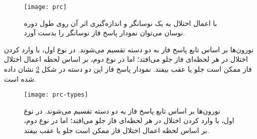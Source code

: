\begin{figure}[h!]
	\centering
	\texttt{[image: prc]}
    \caption{
با اعمال اختلال به یک نوسانگر و اندازه‌گیری اثر آن روی طول دوره نوسان می‌توان نمودار پاسخ فاز نوسانگر را بدست آورد.
\label{fig:prc}
    }
\end{figure}

  نورون‌ها بر اساس تابع پاسخ فاز به دو دسته تقسیم می‌شوند. در نوع اول، با وارد کردن اختلال در هر لحظه‌ای فاز جلو می‌افتد؛ اما در نوع دوم، بر اساس لحظه اعمال اختلال فاز ممکن است جلو یا عقب بیفتد. نمودار پاسخ فاز این دو دسته در شکل 
\ref{fig:prc-type}
  نشان داده شده است.
  
\begin{figure}
	\centering
	\texttt{[image: prc-types]}
    \caption{
  نورون‌ها بر اساس تابع پاسخ فاز به دو دسته تقسیم می‌شوند. در نوع اول، با وارد کردن اختلال در هر لحظه‌ای فاز جلو می‌افتد؛ اما در نوع دوم، بر اساس لحظه اعمال اختلال فاز ممکن است جلو یا عقب بیفتد.
    }
    \label{fig:prc-type}
\end{figure}

  
  
  
  
  
  
  
  
  
  
  
  
  
  
  
  
  
  
  
  
  
  
